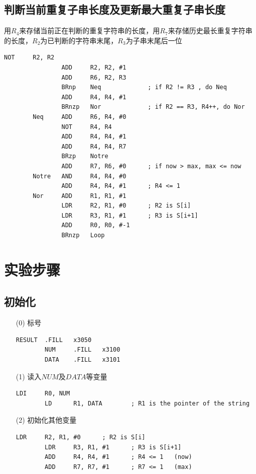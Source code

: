 \documentclass[UTF8]{ctexart}
\begin{document}
    \clearpage
    \subsection{判断当前重复子串长度及更新最大重复子串长度}
    用$R_4$来存储当前正在判断的重复字符串的长度，用$R_7$来存储历史最长重复字符串的长度，$R_2$为已判断的字符串末尾，$R_3$为子串末尾后一位
    \begin{lstlisting}[basicstyle=\ttfamily,language={[x86masm]Assembler}]
                NOT     R2, R2
                ADD     R2, R2, #1
                ADD     R6, R2, R3      
                BRnp    Neq             ; if R2 != R3 , do Neq
                ADD     R4, R4, #1      
                BRnzp   Nor             ; if R2 == R3, R4++, do Nor 
        Neq     ADD     R6, R4, #0      
                NOT     R4, R4          
                ADD     R4, R4, #1      
                ADD     R4, R4, R7      
                BRzp    Notre            
                ADD     R7, R6, #0      ; if now > max, max <= now
        Notre   AND     R4, R4, #0
                ADD     R4, R4, #1      ; R4 <= 1
        Nor     ADD     R1, R1, #1
                LDR     R2, R1, #0      ; R2 is S[i]
                LDR     R3, R1, #1      ; R3 is S[i+1]
                ADD     R0, R0, #-1     
                BRnzp   Loop
    \end{lstlisting}


\section{实验步骤}
\subsection{初始化}
\begin{enumerate}
    \item [(0)]标号
    \begin{lstlisting}[basicstyle=\ttfamily,language={[x86masm]Assembler}]
        RESULT  .FILL   x3050
        NUM     .FILL   x3100
        DATA    .FILL   x3101
    \end{lstlisting}

    \item [(1)]读入$NUM$及$DATA$等变量
    \begin{lstlisting}[basicstyle=\ttfamily,language={[x86masm]Assembler}]
        LDI     R0, NUM
        LD      R1, DATA        ; R1 is the pointer of the string
    \end{lstlisting}

    \item [(2)]初始化其他变量
    \begin{lstlisting}[basicstyle=\ttfamily,language={[x86masm]Assembler}]
        LDR     R2, R1, #0      ; R2 is S[i]
        LDR     R3, R1, #1      ; R3 is S[i+1]
        ADD     R4, R4, #1      ; R4 <= 1   (now)
        ADD     R7, R7, #1      ; R7 <= 1   (max)
    \end{lstlisting}
\end{enumerate}
\end{document}
